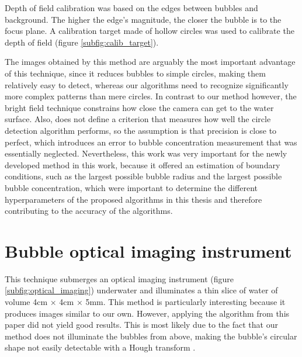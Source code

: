 	Depth of field calibration was based on the edges between bubbles and background. The higher the edge's magnitude, the closer the bubble is to the focus plane. A calibration target made of hollow circles was used to calibrate the depth of field (figure \ref{subfig:calib_target}). 
	
	The images obtained by this method are arguably the most important advantage of this technique, since it reduces bubbles to simple circles, making them relatively easy to detect, whereas our algorithms need to recognize significantly more complex patterns than mere circles.
	 In contrast to our method however, the bright field technique constrains how close the camera can get to the water surface. Also, \citet{Leonie} does not define a criterion that measures how well the circle detection algorithm performs, so the assumption is that precision is close to perfect, which introduces an error to bubble concentration measurement that was essentially neglected. 
	 Nevertheless, this work was very important for the newly developed method in this work, because it offered an estimation of boundary conditions, such as the largest possible bubble radius and the largest possible bubble concentration, which were important to determine the different hyperparameters of the proposed algorithms in this thesis and therefore contributing to the accuracy of the algorithms. 
	
	
\section{Bubble optical imaging instrument}
	This technique submerges an optical imaging instrument (figure \ref{subfig:optical_imaging}) underwater and illuminates a thin slice	of water of volume 4cm $\times$ 4cm $\times$ 5mm. This method is particularly interesting because it produces images similar to our own. However, applying the algorithm from this paper did not yield good results. This is most likely due to the fact that our method does not illuminate the bubbles from above, making the bubble's circular shape not easily detectable with a Hough transform \citep{Hough1972} \citep{Al-Lashi2016}.
	
